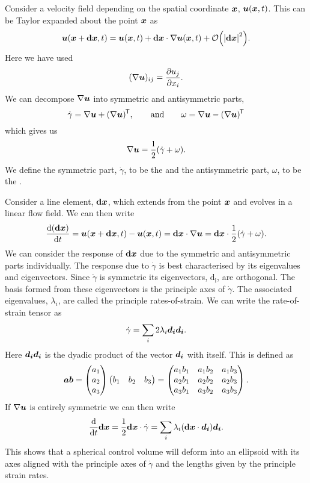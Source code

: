 \documentclass[a4paper]{article}
\newcommand{\vd}[1]{\vv{\mathrm{d}{#1}}}
\begin{document}
    Consider a velocity field depending on the spatial coordinate \(\bm{x}\), \(\bm{u}(\bm{x}, t)\).
    This can be Taylor expanded about the point \(\bm{x}\) as
    \[\vv{u}(\vv{x} + \vd{x}, t) = \vv{u}(\vv{x}, t) + \vd{x}\cdot\grad\vv{u}(\vv{x}, t) + \order{\abs{\vd{x}}^2}.\]
    Here we have used
    \[(\nabla\bm{u})_{ij} = \pdv{u_j}{x_i}.\]
    We can decompose \(\nabla\bm{u}\) into symmetric and antisymmetric parts,
    \[\dot{\gamma} = \nabla\bm{u} + (\nabla\bm{u})^{\mkern-1.5mu\mathsf{T}}, \qquad\text{and}\qquad \omega = \nabla\bm{u} - (\nabla\bm{u})^{\mkern-1.5mu\mathsf{T}}\]
    which gives us
    \[\nabla\bm{u} = \frac{1}{2}(\dot{\gamma} + \omega).\]
    We define the symmetric part, \(\dot{\gamma}\), to be the  and the antisymmetric part, \(\omega\), to be the .
    
    Consider a line element, \(\vd{x}\), which extends from the point \(\bm{x}\) and evolves in a linear flow field.
    We can then write
    \[\dv{(\vd{x})}{t} = \vv{u}(\vv{x} + \vd{x}, t) - \vv{u}(\vv{x}, t) = \vd{x}\cdot\grad\vv{u} = \vd{x}\cdot\frac{1}{2}(\dot{\gamma} + \omega).\]
    We can consider the response of \(\vd{x}\) due to the symmetric and antisymmetric parts individually.
    The response due to \(\dot{\gamma}\) is best characterised by its eigenvalues and eigenvectors.
    Since \(\dot{\gamma}\) is symmetric its eigenvectors, \(\mathrm{d_i}\), are orthogonal.
    The basis formed from these eigenvectors is the principle axes of \(\dot{\gamma}\).
    The associated eigenvalues, \(\lambda_i\), are called the principle rates-of-strain.
    We can write the rate-of-strain tensor as
    \[\dot{\gamma} = \sum_{i} 2\lambda_{i}\bm{d_i}\bm{d_i}.\]
    Here \(\bm{d_i}\bm{d_i}\) is the dyadic product of the vector \(\bm{d_i}\) with itself.
    This is defined as
    \[
        \bm{a}\bm{b} = 
        \begin{pmatrix}
            a_1\\ a_2\\ a_3
        \end{pmatrix}
        \begin{pmatrix}
            b_1 & b_2 & b_3
        \end{pmatrix}
        =
        \begin{pmatrix}
            a_1b_1 & a_1b_2 & a_1b_3\\
            a_2b_1 & a_2b_2 & a_2b_3\\
            a_3b_1 & a_3b_2 & a_3b_3
        \end{pmatrix}
        .
    \]
    If \(\nabla\bm{u}\) is entirely symmetric we can then write 
    \[\dv{t}\vd{x} = \frac{1}{2}\vd{x}\cdot\dot{\gamma} = \sum_{i}\lambda_i(\vd{x}\cdot\vv{d_i})\vv{d_i}.\]
    This shows that a spherical control volume will deform into an ellipsoid with its axes aligned with the principle axes of \(\dot{\gamma}\) and the lengths given by the principle strain rates.
    
\end{document}
